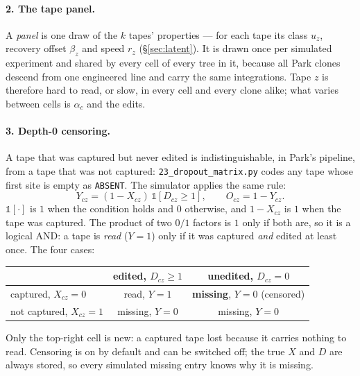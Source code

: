 \paragraph{2. The tape panel.} A \emph{panel} is one draw of the $k$ tapes' properties --- for each
tape its class $u_z$, recovery offset $\beta_z$ and speed $r_z$ (\S\ref{sec:latent}). It is drawn once
per simulated experiment and shared by every cell of every tree in it, because all Park clones descend
from one engineered line and carry the same integrations. Tape $z$ is therefore hard to read, or slow,
in every cell and every clone alike; what varies between cells is $\alpha_c$ and the edits.

\paragraph{3. Depth-0 censoring.} A tape that was captured but never edited is indistinguishable, in
Park's pipeline, from a tape that was not captured: \texttt{23\_dropout\_matrix.py} codes any tape whose
first site is empty as \texttt{ABSENT}. The simulator applies the same rule:
\begin{equation}
  Y_{cz}=(1-X_{cz})\,\mathbb 1[D_{cz}\ge1],\qquad O_{cz}=1-Y_{cz}.
  \label{eq:observe1}
\end{equation}
$\mathbb 1[\cdot]$ is $1$ when the condition holds and $0$ otherwise, and $1-X_{cz}$ is $1$ when the tape
was captured. The product of two $0/1$ factors is $1$ only if both are, so it is a logical AND: a tape
is \emph{read} ($Y=1$) only if it was captured \emph{and} edited at least once. The four cases:
\begin{center}\small
\begin{tabular}{@{}lcc@{}}
\toprule
 & edited, $D_{cz}\ge1$ & unedited, $D_{cz}=0$ \\
\midrule
captured, $X_{cz}=0$     & read, $Y=1$     & \textbf{missing}, $Y=0$ (censored) \\
not captured, $X_{cz}=1$ & missing, $Y=0$  & missing, $Y=0$ \\
\bottomrule
\end{tabular}
\end{center}
Only the top-right cell is new: a captured tape lost because it carries nothing to read. Censoring is
on by default and can be switched off; the true $X$ and $D$ are always stored, so every simulated
missing entry knows why it is missing.

